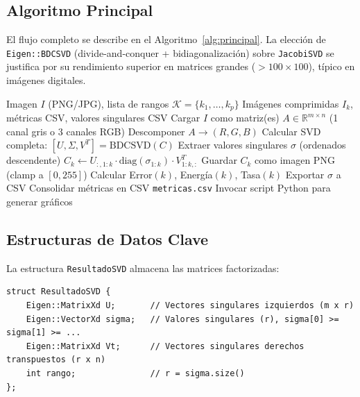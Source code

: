 ﻿\documentclass[12pt,a4paper]{article}
\theoremstyle{definition}
\newcommand{\R}{\mathbb{R}}
\begin{document}
\subsection{Algoritmo Principal}

El flujo completo se describe en el Algoritmo~\ref{alg:principal}. La elecci\'{o}n de \texttt{Eigen::BDCSVD} (divide-and-conquer + bidiagonalizaci\'{o}n) sobre \texttt{JacobiSVD} se justifica por su rendimiento superior en matrices grandes ($> 100 \times 100$), t\'{i}pico en im\'{a}genes digitales.

\begin{algorithm}[H]
\caption{Compresi\'{o}n de imagen mediante SVD.}
\label{alg:principal}
\begin{algorithmic}[1]
\Require Imagen $I$ (PNG/JPG), lista de rangos $\mathcal{K} = \{k_1, \dots, k_p\}$
\Ensure Im\'{a}genes comprimidas $I_k$, m\'{e}tricas CSV, valores singulares CSV
\State Cargar $I$ como matriz(es) $A \in \R^{m \times n}$ (1 canal gris o 3 canales RGB)
    \State Descomponer $A \rightarrow (R, G, B)$
\EndIf
{}
    \State Calcular SVD completa: $[U, \Sigma, V^T] = \text{BDCSVD}(C)$
    \State Extraer valores singulares $\sigma$ (ordenados descendente)
        \State $C_k \leftarrow U_{:,1:k} \cdot \text{diag}(\sigma_{1:k}) \cdot V^T_{1:k,:}$
        \State Guardar $C_k$ como imagen PNG (clamp a $[0, 255]$)
        \State Calcular Error$(k)$, Energ\'{i}a$(k)$, Tasa$(k)$
    \EndFor
    \State Exportar $\sigma$ a CSV
\EndFor
\State Consolidar m\'{e}tricas en CSV \texttt{metricas.csv}
\State Invocar script Python para generar gr\'{a}ficos
\end{algorithmic}
\end{algorithm}

\subsection{Estructuras de Datos Clave}

La estructura \texttt{ResultadoSVD} almacena las matrices factorizadas:

\begin{lstlisting}[caption={Estructura ResultadoSVD (src/svd\_procesador.hpp).}]
struct ResultadoSVD {
    Eigen::MatrixXd U;       // Vectores singulares izquierdos (m x r)
    Eigen::VectorXd sigma;   // Valores singulares (r), sigma[0] >= sigma[1] >= ...
    Eigen::MatrixXd Vt;      // Vectores singulares derechos transpuestos (r x n)
    int rango;               // r = sigma.size()
};
\end{lstlisting}
\end{document}
